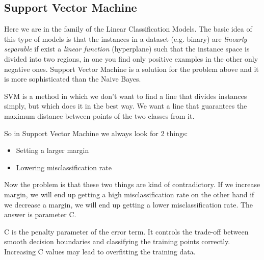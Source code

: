 \documentclass[12pt]{article}
\begin{document}
\subsection{Support Vector Machine}
Here we are in the family of the Linear Classification Models. The basic idea of this type of models is that the instances in a dataset (e.g. binary) are {\em linearly separable} if exist a {\em linear function} (hyperplane) such that the instance space is divided into two regions, in one you find only positive examples in the other only negative ones. Support Vector Machine is a solution for the problem above and it is more sophisticated than the Naive Bayes.

SVM is a method in which we don’t want to find a line that divides instances simply, but which does it in the best way. We want a line that guarantees the maximum distance between points of the two classes from it.

So in Support Vector Machine we always look for 2 things:
\begin{itemize}
\item Setting a larger margin
\item Lowering misclassification rate
\end{itemize}
Now the problem is that these two things are kind of contradictory. If we increase margin, we will end up getting a high misclassification rate on the other hand if we decrease a margin, we will end up getting a lower misclassification rate. The answer is parameter C.

C is the penalty parameter of the error term. It controls the trade-off between smooth decision boundaries and classifying the training points correctly. Increasing C values may lead to overfitting the training data.
\end{document}
